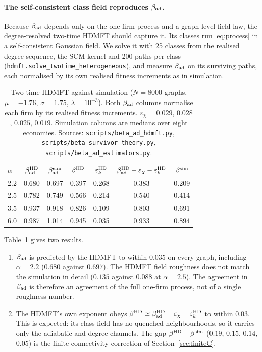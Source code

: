 \documentclass[11pt]{article}
\theoremstyle{remark}
\begin{document}
\paragraph{The self-consistent class field reproduces $\beta_{\rm ad}$.}
Because $\beta_{\rm ad}$ depends only on the one-firm process and a graph-level field law, the
degree-resolved two-time HDMFT should capture it.  Its classes run \eqref{eq:process} in a
self-consistent Gaussian field.  We solve it with 25 classes from the realised degree
sequence, the SCM kernel and 200 paths per class
(\texttt{hdmft.solve\_\allowbreak twotime\_\allowbreak heterogeneous}), and measure
$\beta_{\rm ad}$ on its surviving paths, each normalised by its own realised fitness increments
as in simulation.

\begin{table}[h]
\centering
\small\setlength{\tabcolsep}{4pt}
\begin{tabular}{l|cc|ccc|c}
\toprule
$\alpha$ & $\beta_{\rm ad}^{\rm HD}$ & $\beta_{\rm ad}^{\rm sim}$
 & $\beta^{\rm HD}$ & $\varepsilon_k^{\rm HD}$
 & $\beta_{\rm ad}^{\rm HD}-\varepsilon_\chi-\varepsilon_k^{\rm HD}$ & $\beta^{\rm sim}$\\
\midrule
2.2 & 0.680 & 0.697 & 0.397 & 0.268 & 0.383 & 0.209\\
2.5 & 0.782 & 0.749 & 0.566 & 0.214 & 0.540 & 0.414\\
3.5 & 0.937 & 0.918 & 0.826 & 0.109 & 0.803 & 0.691\\
6.0 & 0.987 & 1.014 & 0.945 & 0.035 & 0.933 & 0.894\\
\bottomrule
\end{tabular}
\caption{Two-time HDMFT against simulation ($N=8000$ graphs, $\mu=-1.76$, $\sigma=1.75$,
$\lambda=10^{-3}$).  Both $\beta_{\rm ad}$ columns normalise each firm by its realised fitness
increments.  $\varepsilon_\chi=0.029$, $0.028$, $0.025$, $0.019$.  Simulation columns are
medians over eight economies.  Sources: \texttt{scripts/beta\_ad\_hdmft.py},
\texttt{scripts/beta\_survivor\_theory.py}, \texttt{scripts/beta\_ad\_estimators.py}.}
\label{tab:hdmft}
\end{table}

Table~\ref{tab:hdmft} gives two results.
\begin{enumerate}
  \item $\beta_{\rm ad}$ is predicted by the HDMFT to within $0.035$ on every graph, including
        $\alpha=2.2$ ($0.680$ against $0.697$).  The HDMFT field roughness does not match the
        simulation in detail ($0.135$ against $0.088$ at $\alpha=2.5$).  The agreement in
        $\beta_{\rm ad}$ is therefore an agreement of the full one-firm process, not of a single
        roughness number.
  \item The HDMFT's own exponent obeys $\beta^{\rm HD}\simeq\beta_{\rm ad}^{\rm HD}-
        \varepsilon_\chi-\varepsilon_k^{\rm HD}$ to within $0.03$.  This is expected: its class
        field has no quenched neighbourhoods, so it carries only the adiabatic and degree
        channels.  The gap $\beta^{\rm HD}-\beta^{\rm sim}$ ($0.19$, $0.15$, $0.14$, $0.05$) is the
        finite-connectivity correction of Section~\ref{sec:finiteC}.
\end{enumerate}
\end{document}
